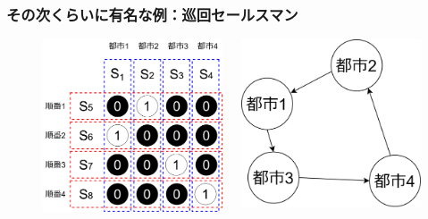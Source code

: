\begin{frame}
  \frametitle{その次くらいに有名な例：巡回セールスマン}
  \begin{figure}[h]
    \begin{columns}
      \begin{column}{0.55\linewidth}        
        \includegraphics[width=0.9\linewidth]{data/TSP_example}
      \end{column}
      \begin{column}{0.45\linewidth}
        \centering
        \includegraphics[width=0.8\linewidth]{data/TSP_example_graph}    
      \end{column}
    \end{columns}
  \end{figure}
\end{frame}


